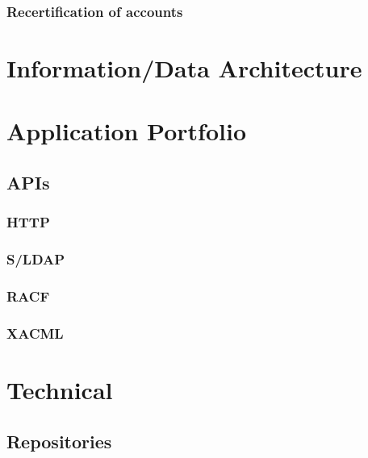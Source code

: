\hypertarget{recertification-of-accounts}{%
\subsubsection{Recertification of
accounts}\label{recertification-of-accounts}}

\hypertarget{informationdata-architecture}{%
\section{Information/Data
Architecture}\label{informationdata-architecture}}

\hypertarget{application-portfolio}{%
\section{Application Portfolio}\label{application-portfolio}}

\hypertarget{apis}{%
\subsection{APIs}\label{apis}}

\hypertarget{http}{%
\subsubsection{HTTP}\label{http}}

\hypertarget{sldap}{%
\subsubsection{S/LDAP}\label{sldap}}

\hypertarget{racf}{%
\subsubsection{RACF}\label{racf}}

\hypertarget{xacml}{%
\subsubsection{XACML}\label{xacml}}

\hypertarget{technical}{%
\section{Technical}\label{technical}}

\hypertarget{repositories}{%
\subsection{Repositories}\label{repositories}}

